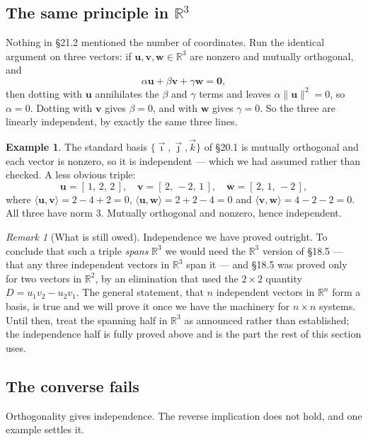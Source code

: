 \documentclass[11pt]{article}
\theoremstyle{definition}
\newtheorem{ex}{Example}[section]
\theoremstyle{remark}
\newtheorem*{rmk}{Remark}
\newcommand{\R}{\mathbb{R}}
\newcommand{\vc}[1]{\mathbf{#1}}
\newcommand{\norm}[1]{\lVert #1\rVert}
\newcommand{\ivec}{\vec{\imath}}
\newcommand{\jvec}{\vec{\jmath}}
\newcommand{\kvec}{\vec{k}}
\begin{document}
\subsection{The same principle in \texorpdfstring{$\R^{3}$}{R3}}
Nothing in \S21.2 mentioned the number of coordinates. Run the identical
argument on three vectors: if $\vc{u},\vc{v},\vc{w}\in\R^{3}$ are nonzero and
mutually orthogonal, and
\[
  \alpha\vc{u} + \beta\vc{v} + \gamma\vc{w} = \vc{0} ,
\]
then dotting with $\vc{u}$ annihilates the $\beta$ and $\gamma$ terms and leaves
$\alpha\norm{\vc{u}}^{2}=0$, so $\alpha=0$. Dotting with $\vc{v}$ gives
$\beta=0$, and with $\vc{w}$ gives $\gamma=0$. So the three are linearly
independent, by exactly the same three lines.

\begin{ex}
The standard basis $\{\ivec,\jvec,\kvec\}$ of \S20.1 is mutually orthogonal and
each vector is nonzero, so it is independent --- which we had assumed rather
than checked. A less obvious triple:
\[
  \vc{u}=[\,1,\,2,\,2\,],\quad
  \vc{v}=[\,2,\,-2,\,1\,],\quad
  \vc{w}=[\,2,\,1,\,-2\,] ,
\]
where $\langle\vc{u},\vc{v}\rangle=2-4+2=0$,
$\langle\vc{u},\vc{w}\rangle=2+2-4=0$ and
$\langle\vc{v},\vc{w}\rangle=4-2-2=0$. All three have norm $3$. Mutually
orthogonal and nonzero, hence independent.
\end{ex}

\begin{rmk}[What is still owed]
Independence we have proved outright. To conclude that such a triple
\emph{spans} $\R^{3}$ we would need the $\R^{3}$ version of \S18.5 --- that any
three independent vectors in $\R^{3}$ span it --- and \S18.5 was proved only for
two vectors in $\R^{2}$, by an elimination that used the $2\times2$ quantity
$D=u_1v_2-u_2v_1$. The general statement, that $n$ independent vectors in
$\R^{n}$ form a basis, is true and we will prove it once we have the machinery
for $n\times n$ systems. Until then, treat the spanning half in $\R^{3}$ as
announced rather than established; the independence half is fully proved above
and is the part the rest of this section uses.
\end{rmk}

\subsection{The converse fails}
Orthogonality gives independence. The reverse implication does not hold, and one
example settles it.
\end{document}
